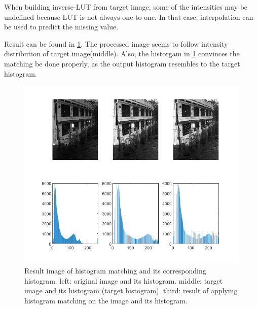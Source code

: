 \documentclass[extendedabs]{bmvc2k}
\begin{document}
When building inverse-LUT from target image, some of the intensities
may be undefined because LUT is not always one-to-one. In that case,
interpolation can be used to predict the missing value.

Result can be found in \figurename{\ref{fig:7}}. The processed image
seems to follow intensity distribution of target image(middle).
Also, the historgam in \figurename{\ref{fig:7}} convinces the
matching be done properly, as the output histogram resembles to the 
target histogram.

\begin{figure}[h]
    \centering
    \includegraphics[width=0.7\linewidth]{hw1_5}
    \caption{Result image of histogram matching and its corresponding histogram. 
    left: original image and its histogram. middle: target image and its histogram (target histogram).
    third: result of applying histogram matching on the image and its histogram.}
    \label{fig:7}
    \vspace{-2mm}
\end{figure}
\end{document}
